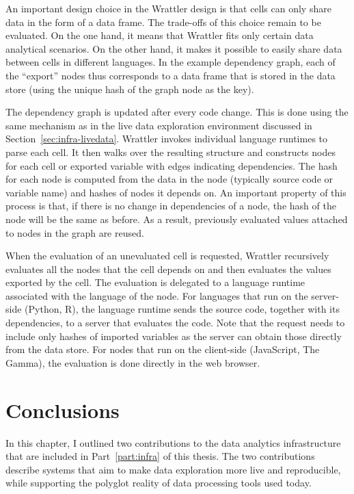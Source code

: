 \documentclass[fleqn,11pt]{report}
\theoremstyle{definition}
\begin{document}
An important design choice in the Wrattler design is that cells can only share data in the form
of a data frame. The trade-offs of this choice remain to be evaluated. On the one hand,
it means that Wrattler fits only certain data analytical scenarios. On the other hand, it
makes it possible to easily share data between cells in different languages. In the
example dependency graph, each of the ``export'' nodes thus corresponds to a data frame that
is stored in the data store (using the unique hash of the graph node as the key).

The dependency graph is updated after every code change. This is done using the same
mechanism as in the live data exploration environment discussed in Section~\ref{sec:infra-livedata}.
Wrattler invokes individual language runtimes to parse each cell. It then walks over the
resulting structure and constructs nodes for each cell or exported variable with edges
indicating dependencies. The hash for each node is computed from the data in the node (typically
source code or variable name) and hashes of nodes it depends on. An important property of this
process is that, if there is no change in dependencies of a node, the hash of the node
will be the same as before. As a result, previously evaluated values attached to nodes
in the graph are reused.

When the evaluation of an unevaluated cell is requested, Wrattler recursively evaluates all
the nodes that the cell depends on and then evaluates the values exported by the cell.
The evaluation is delegated to a language runtime associated with the language of the node.
For languages that run on the server-side (Python, R), the language runtime sends the source
code, together with its dependencies, to a server that evaluates the code. Note that the
request needs to include only hashes of imported variables as the server can obtain those
directly from the data store. For nodes that run on the client-side (JavaScript, The Gamma),
the evaluation is done directly in the web browser.

\section{Conclusions}

In this chapter, I outlined two contributions to the data analytics infrastructure that
are included in Part~\ref{part:infra} of this thesis. The two contributions describe systems
that aim to make data exploration more live and reproducible, while supporting the polyglot
reality of data processing tools used today.
\end{document}
